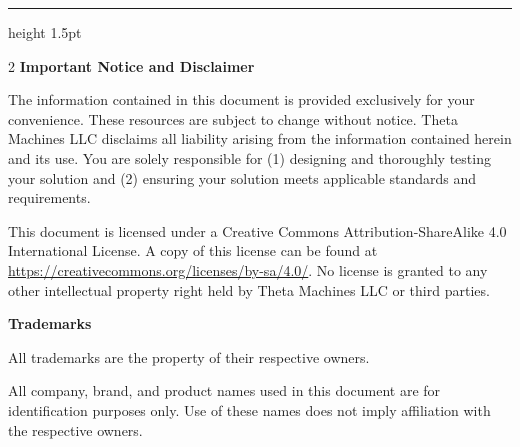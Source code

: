 \vspace*{\fill}
\hrule height 1.5pt

\begin{multicols}{2}
    \textbf{Important Notice and Disclaimer}
    
    The information contained in this document is provided exclusively for your convenience. These resources are subject to change without notice. Theta Machines LLC disclaims all liability arising from the information contained herein and its use. You are solely responsible for (1) designing and thoroughly testing your solution and (2) ensuring your solution meets applicable standards and requirements. 

    This document is licensed under a Creative Commons Attribution-ShareAlike 4.0 International License. A copy of this license can be found at \url{https://creativecommons.org/licenses/by-sa/4.0/}. No license is granted to any other intellectual property right held by Theta Machines LLC or third parties.\textbf{}

    \columnbreak

    \textbf{Trademarks}
    
    All trademarks are the property of their respective owners.

    All company, brand, and product names used in this document are for identification purposes only. Use of these names does not imply affiliation with the respective owners.
\end{multicols}
\newpage
